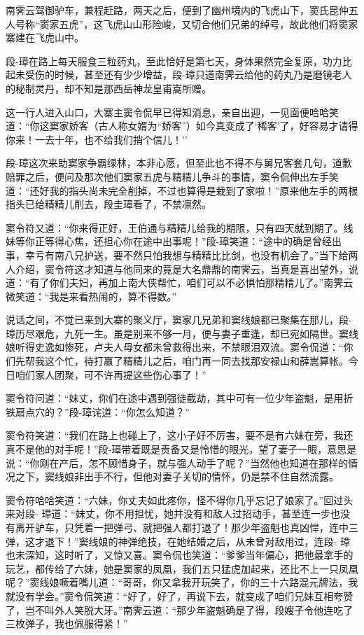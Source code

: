 \documentclass[12pt,oneside]{book}
\begin{document}
南霁云驾御驴车，兼程赶路，两天之后，便到了幽州境内的飞虎山下，窦氏昆仲五人号称``窦家五虎''，这飞虎山山形险峻，又切合他们兄弟的绰号，故此他们将窦家寨建在飞虎山中。

段-璋在路上每天服食三粒药丸，至此恰好是第七天，身体果然完全复原，功力比起未受伤的时候，甚至还有少少增益，段-璋只道南霁云给他的药丸乃是磨镜老人的秘制灵丹，却不知是那西岳神龙皇甫嵩所赠。

这一行人进入山口，大寨主窦令侃早已得知消息，亲自出迎，一见面便哈哈笑道：``你这窦家娇客（古人称女婿为``娇客''）如今真变成了`稀客'了，好容易才请得你来！一去十年，也不给我们捎个信儿！''

段-璋这次来助窦家争霸绿林，本非心愿，但至此也不得不与舅兄客套几句，道歉赔罪之后，便问及那次他们窦家五虎与精精儿争斗的事情，窦令侃伸出左手笑道：``还好我的指头尚未完全削掉，不过也算得是栽到了家啦！''原来他左手的两根指头已给精精儿削去，段圭璋看了，不禁凛然。

窦令符又道：``你来得正好，王伯通与精精儿给我的期限，只有四天就到期了。线妹等你正等得心焦，还担心你在途中出事呢！''段-璋笑道：``途中的确是曾经出事，幸亏有南八兄护送，要不然只怕我想与精精比比剑，也没有机会了。''当下给两人介绍，窦令符这才知道与他同来的竟是大名鼎鼎的南霁云，当真是喜出望外，说道：``有了你们夫妇，再加上南大侠帮忙，咱们可以不必惧怕那精精儿了。''南霁云微笑道：``我是来看热闹的，算不得数。''

说话之间，不觉已来到大寨的聚义厅，窦家几兄弟和窦线娘都已聚集在那儿，段-璋历尽艰危，九死一生。虽是别来不够一月，便与妻子重逢，却已宛如隔世。窦线娘听得史逸如惨死，卢夫人母女都未曾救得出来，不禁眼泪双流。窦令侃道：``你们先帮我这个忙，待打赢了精精儿之后，咱门再一同去找那安禄山和薛嵩算帐。今日咱们家人团聚，可不许再提这些伤心事了！''

窦令符问道：``妹丈，你们在途中遇到强徒截劫，其中可有一位少年盗魁，是用折铁扇点穴的？''段-璋诧道：``你怎么知道？''

窦令符笑道：``我们在路上也碰上了，这小子好不厉害，要不是有六妹在旁，我还真不是他的对手呢！''段-璋带着既是责备又是怜惜的眼光，望了妻子一眼，意思是说：``你刚在产后，怎不顾惜身子，就与强人动手了呢？''当然他也知道在那样的情况之下，窦线娘非出手不行，但他对妻子关切的情怀，仍是禁不住自然流露。

窦令符哈哈笑道：``六妹，你丈夫如此疼你，怪不得你几乎忘记了娘家了。''回过头来对段-
璋道：``妹丈，你不用担忧，她并没有和敌人过招动手，甚至连一步也没有离开驴车，只凭着一把弹弓、就把强人都打退了！那少年盗魁也真凶悍，连中三弹，这才退下！''窦线娘的神弹绝技，在她结婚之后，从未曾对敌用过，连段-
璋也未深知，这时听了，又惊又喜。窦令侃也笑道：``爹爹当年偏心，把他最拿手的玩艺，都传给了六妹，她是窦家的凤凰，我们五只猛虎加起来，还比不上一只凤凰呢？''窦线娘噘着嘴儿道：``哥哥，你又拿我开玩笑了，你的三十六路混元牌法，我就没有学会。''窦令侃笑道：``好了，好了，再说下去，就变成了咱们兄妹互相夸赞了，岂不叫外人笑脱大牙。''南霁云道：``那少年盗魁确是了得，段嫂子令他连吃了三枚弹子，我也佩服得紧！''
\end{document}
